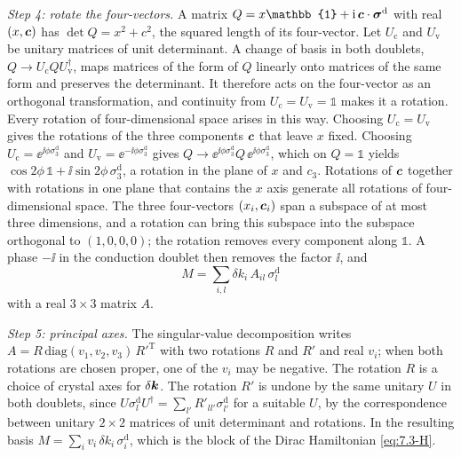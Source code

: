 \emph{Step 4: rotate the four-vectors.} A matrix $Q = x\mathbb{1} + \ii\,\vect{c}\cdot\boldsymbol{\sigma}^{\mathrm{d}}$ with real $(x, \bm{c})$ has $\det Q = x^2 + c^2$, the squared length of its four-vector. Let $U_{\mathrm{c}}$ and $U_{\mathrm{v}}$ be unitary matrices of unit determinant. A change of basis in both doublets, $Q \to U_{\mathrm{c}}QU_{\mathrm{v}}^\dagger$, maps matrices of the form of $Q$ linearly onto matrices of the same form and preserves the determinant. It therefore acts on the four-vector as an orthogonal transformation, and continuity from $U_{\mathrm{c}} = U_{\mathrm{v}} = \mathbb{1}$ makes it a rotation. Every rotation of four-dimensional space arises in this way. Choosing $U_{\mathrm{c}} = U_{\mathrm{v}}$ gives the rotations of the three components $\bm{c}$ that leave $x$ fixed. Choosing $U_{\mathrm{c}} = \ee^{\ii\phi\sigma^{\mathrm{d}}_3}$ and $U_{\mathrm{v}} = \ee^{-\ii\phi\sigma^{\mathrm{d}}_3}$ gives $Q \to \ee^{\ii\phi\sigma^{\mathrm{d}}_3}Q\,\ee^{\ii\phi\sigma^{\mathrm{d}}_3}$, which on $Q = \mathbb{1}$ yields $\cos2\phi\,\mathbb{1} + \ii\sin2\phi\,\sigma^{\mathrm{d}}_3$, a rotation in the plane of $x$ and $c_3$. Rotations of $\bm{c}$ together with rotations in one plane that contains the $x$ axis generate all rotations of four-dimensional space. The three four-vectors $(x_i, \bm{c}_i)$ span a subspace of at most three dimensions, and a rotation can bring this subspace into the subspace orthogonal to $(1, 0, 0, 0)$; the rotation removes every component along $\mathbb{1}$. A phase $-\ii$ in the conduction doublet then removes the factor $\ii$, and
\begin{equation*}
  M = \sum_{i,l}\delta k_i\,A_{il}\,\sigma^{\mathrm{d}}_l
\end{equation*}
with a real $3\times3$ matrix $A$.

\emph{Step 5: principal axes.} The singular-value decomposition writes $A = R\,\mathrm{diag}(v_1, v_2, v_3)\,R'^{\mathrm{T}}$ with two rotations $R$ and $R'$ and real $v_i$; when both rotations are chosen proper, one of the $v_i$ may be negative. The rotation $R$ is a choice of crystal axes for $\delta\bm{k}$. The rotation $R'$ is undone by the same unitary $U$ in both doublets, since $U\sigma^{\mathrm{d}}_lU^\dagger = \sum_{l'}R'_{ll'}\sigma^{\mathrm{d}}_{l'}$ for a suitable $U$, by the correspondence between unitary $2\times2$ matrices of unit determinant and rotations. In the resulting basis $M = \sum_iv_i\,\delta k_i\,\sigma^{\mathrm{d}}_i$, which is the block of the Dirac Hamiltonian \cref{eq:7.3-H}.

